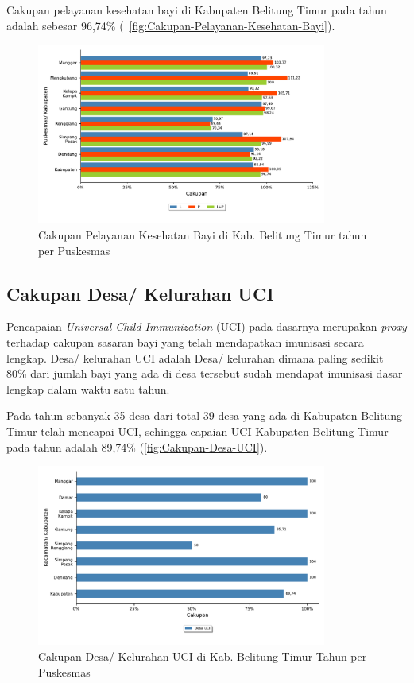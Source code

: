 Cakupan pelayanan kesehatan bayi di Kabupaten Belitung Timur pada
tahun \tP adalah sebesar 96,74\% (~\autoref{fig:Cakupan-Pelayanan-Kesehatan-Bayi}).

\begin{figure}[H]
    \centering
    \includegraphics[width=0.85\textwidth]{bab_05/bab_05_16_pelayananBayi}
    \caption{Cakupan Pelayanan Kesehatan Bayi di Kab. Belitung Timur tahun \tP per Puskesmas}
    \label{fig:Cakupan-Pelayanan-Kesehatan-Bayi}
\end{figure}

\subsection{Cakupan Desa/ Kelurahan UCI}
Pencapaian \emph{Universal Child Immunization} (UCI) pada dasarnya merupakan
\emph{proxy} terhadap cakupan sasaran bayi yang telah mendapatkan imunisasi
secara lengkap. Desa/ kelurahan UCI adalah Desa/ kelurahan dimana
paling sedikit 80\% dari jumlah bayi yang ada di desa tersebut sudah
mendapat imunisasi dasar lengkap dalam waktu satu tahun.

Pada tahun \tP sebanyak 35 desa dari total 39 desa yang ada di Kabupaten Belitung
Timur telah mencapai UCI, sehingga capaian UCI Kabupaten Belitung
Timur pada tahun \tP adalah 89,74\% (\autoref{fig:Cakupan-Desa-UCI}).

\begin{figure}[H]
    \centering
    \includegraphics[width=0.85\textwidth]{bab_05/bab_05_17_UCI}
    \caption{Cakupan Desa/ Kelurahan UCI di Kab. Belitung Timur Tahun \tP per Puskesmas}
    \label{fig:Cakupan-Desa-UCI}
\end{figure}

